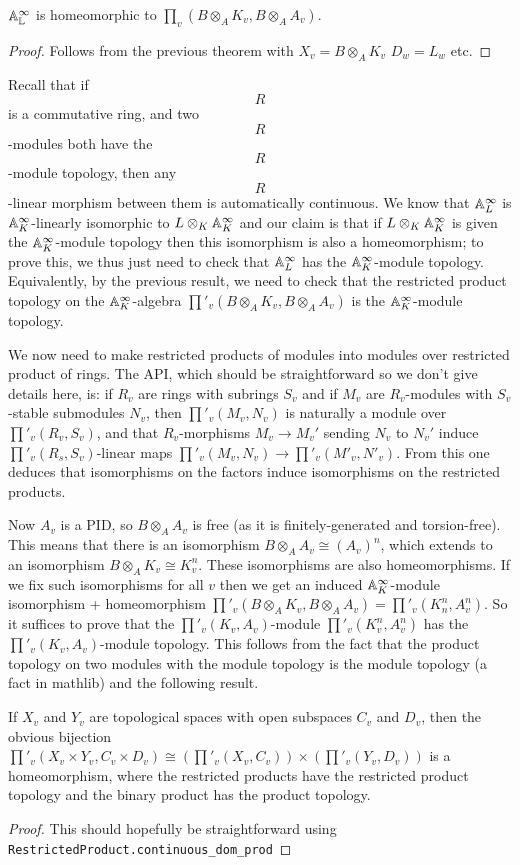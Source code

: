 \begin{corollary} $\mathbb{\mathbb{A}_L^\infty}$ is homeomorphic to $\prod_v(B\otimes_AK_v,B\otimes_AA_v)$.
\end{corollary}
\begin{proof} Follows from the previous theorem with $X_v=B\otimes_AK_v$ $D_w=L_w$ etc.
\end{proof}

Recall that if $$R$$ is a commutative ring, and two $$R$$-modules both have the $$R$$-module
topology, then any $$R$$-linear morphism between them is automatically continuous. We know
that $\mathbb{A}_L^\infty$ is $\mathbb{A}_K^\infty$-linearly isomorphic to $L\otimes_K\mathbb{A}_K^\infty$ and our claim is that
if $L\otimes_K\mathbb{A}_K^\infty$ is given the $\mathbb{A}_K^\infty$-module topology then this isomorphism is also a
homeomorphism; to prove this, we thus just need to check that $\mathbb{A}_L^\infty$ has the $\mathbb{A}_K^\infty$-module
topology. Equivalently, by the previous result, we need to check that
the restricted product topology on the $\mathbb{A}_K^\infty$-algebra $\prod'_v(B\otimes_AK_v,B\otimes_AA_v)$
is the $\mathbb{A}_K^\infty$-module topology.

We now need to make restricted products of modules into modules over restricted product of rings.
The API, which should be straightforward so we don't give details here, is: if $R_v$ are rings
with subrings $S_v$ and if $M_v$ are $R_v$-modules with $S_v$-stable submodules $N_v$, then
$\prod'_v(M_v,N_v)$ is naturally a module over $\prod'_v(R_v,S_v)$, and that $R_v$-morphisms
$M_v\to M_v'$ sending $N_v$ to $N_v'$ induce $\prod'_v(R_s,S_v)$-linear maps
$\prod'_v(M_v,N_v)\to\prod'_v(M'_v,N'_v)$. From this one deduces that isomorphisms on the factors
induce isomorphisms on the restricted products.


Now $A_v$ is a PID, so $B\otimes_AA_v$ is free (as it is finitely-generated and torsion-free).
This means that there is an isomorphism $B\otimes_AA_v\cong(A_v)^n$, which extends to an isomorphism
$B\otimes_AK_v\cong K_v^n$. These isomorphisms are also homeomorphisms. If we fix such isomorphisms
for all $v$ then we get an induced $\mathbb{A}_K^\infty$-module isomorphism + homeomorphism
$\prod'_v(B\otimes_AK_v,B\otimes_AA_v)=\prod'_v(K_n^n,A_v^n)$. So it suffices to prove
that the $\prod'_v(K_v,A_v)$-module $\prod'_v(K_v^n,A_v^n)$ has the $\prod'_v(K_v,A_v)$-module
topology. This follows from the fact that the product topology on two modules with the
module topology is the module topology (a fact in mathlib) and the following result.

\begin{lemma}
  If $X_v$ and $Y_v$ are topological spaces with open subspaces $C_v$ and $D_v$, then
  the obvious bijection $\prod'_v(X_v \times Y_v,C_v\times D_v) \cong
  \left(\prod'_v(X_v,C_v)\right)\times\left(\prod'_v(Y_v,D_v)\right)$ is a homeomorphism,
  where the restricted products have the restricted product topology and the binary
  product has the product topology.
\end{lemma}
\begin{proof} This should hopefully be straightforward using {\tt RestrictedProduct.continuous\_dom\_prod}
\end{proof}

